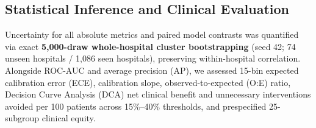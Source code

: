 \subsection{Statistical Inference and Clinical Evaluation}
Uncertainty for all absolute metrics and paired model contrasts was quantified via exact \textbf{5,000-draw whole-hospital cluster bootstrapping} (seed 42; 74 unseen hospitals / 1,086 seen hospitals), preserving within-hospital correlation.\cite{davison1997bootstrap,obuchowski1997clustered} Alongside ROC-AUC and average precision (AP), we assessed 15-bin expected calibration error (ECE), calibration slope, observed-to-expected (O:E) ratio,\cite{vancalster2019calibration,austin2019ici} Decision Curve Analysis (DCA) net clinical benefit and unnecessary interventions avoided per 100 patients across 15\%--40\% thresholds,\cite{vickers2006decision} and prespecified 25-subgroup clinical equity.

